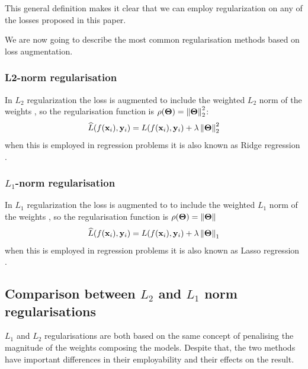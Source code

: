 \documentclass[sn-mathphys-num]{sn-jnl}%
\newcommand{\tod}[1]{{\color{magenta}\textbf{***{#1}***}}}
\renewcommand\vec{\mathbf}
\begin{document}
This general definition makes it clear that we can employ regularization on any of the losses proposed in this paper.

We are now going to describe the most common regularisation methods based on loss augmentation.
\subsubsection{L2-norm regularisation}\label{l2_norm_regularisation}
In $L_2$ regularization the loss is augmented to include the weighted $L_2$ norm of the weights \cite{ML_2,ML_3}, so the regularisation function is $\rho(\vec{\Theta}) = \norm{\vec{\Theta}}^2_2$:
\begin{equation}\label{L2-reg-eq}
\widehat{L}(f(\vec{x}_i),\vec{y}_i)  = L(f(\vec{x}_i),\vec{y}_i) + \lambda \norm{\vec{\Theta}}^2_2
\end{equation}
when this is employed in regression problems it is also known as Ridge regression \cite{ridge_regression,ML_2}. 

\subsubsection{$L_1$-norm regularisation}\label{L1-reg}
In $L_1$ regularization the loss is augmented to to include the weighted $L_1$ norm of the weights \cite{ML_2,ML_3}, so the regularisation function is $\rho(\vec{\Theta}) = \norm{\vec{\Theta}}$
\begin{equation}\label{L1-reg-eq}
\widehat{L}(f(\vec{x}_i),\vec{y}_i)  = L(f(\vec{x}_i),\vec{y}_i) + \lambda \norm{\vec{\Theta}}_1
\end{equation}
when this is employed in regression problems it is also known as Lasso regression \cite{lasso_regression,ML_2}.


\subsection{Comparison between $L_2$ and $L_1$ norm regularisations}
$L_1$ and $L_2$ regularisations are both based on the same concept of penalising the magnitude of the weights composing the models. Despite that, the two methods have important differences in their employability and their effects on the result. 
\end{document}
